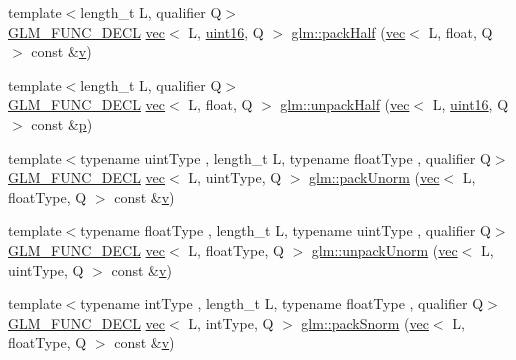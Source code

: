 \begin{DoxyCompactItemize}
\item 
{\footnotesize template$<$length\+\_\+t L, qualifier Q$>$ }\\\mbox{\hyperlink{setup_8hpp_ab2d052de21a70539923e9bcbf6e83a51}{G\+L\+M\+\_\+\+F\+U\+N\+C\+\_\+\+D\+E\+CL}} \mbox{\hyperlink{structglm_1_1vec}{vec}}$<$ L, \mbox{\hyperlink{group__gtc__type__precision_gad8c2939e1fdd8e5828b31d95c52255d5}{uint16}}, Q $>$ \mbox{\hyperlink{group__gtc__packing_ga2d8bbce673ebc04831c1fb05c47f5251}{glm\+::pack\+Half}} (\mbox{\hyperlink{structglm_1_1vec}{vec}}$<$ L, float, Q $>$ const \&\mbox{\hyperlink{_s_d_l__opengl_8h_a10a82eabcb59d2fcd74acee063775f90}{v}})
\item 
{\footnotesize template$<$length\+\_\+t L, qualifier Q$>$ }\\\mbox{\hyperlink{setup_8hpp_ab2d052de21a70539923e9bcbf6e83a51}{G\+L\+M\+\_\+\+F\+U\+N\+C\+\_\+\+D\+E\+CL}} \mbox{\hyperlink{structglm_1_1vec}{vec}}$<$ L, float, Q $>$ \mbox{\hyperlink{group__gtc__packing_ga30d6b2f1806315bcd6047131f547d33b}{glm\+::unpack\+Half}} (\mbox{\hyperlink{structglm_1_1vec}{vec}}$<$ L, \mbox{\hyperlink{group__gtc__type__precision_gad8c2939e1fdd8e5828b31d95c52255d5}{uint16}}, Q $>$ const \&\mbox{\hyperlink{_s_d_l__opengl__glext_8h_aa5367c14d90f462230c2611b81b41d23}{p}})
\item 
{\footnotesize template$<$typename uint\+Type , length\+\_\+t L, typename float\+Type , qualifier Q$>$ }\\\mbox{\hyperlink{setup_8hpp_ab2d052de21a70539923e9bcbf6e83a51}{G\+L\+M\+\_\+\+F\+U\+N\+C\+\_\+\+D\+E\+CL}} \mbox{\hyperlink{structglm_1_1vec}{vec}}$<$ L, uint\+Type, Q $>$ \mbox{\hyperlink{group__gtc__packing_gaccd3f27e6ba5163eb7aa9bc8ff96251a}{glm\+::pack\+Unorm}} (\mbox{\hyperlink{structglm_1_1vec}{vec}}$<$ L, float\+Type, Q $>$ const \&\mbox{\hyperlink{_s_d_l__opengl_8h_a10a82eabcb59d2fcd74acee063775f90}{v}})
\item 
{\footnotesize template$<$typename float\+Type , length\+\_\+t L, typename uint\+Type , qualifier Q$>$ }\\\mbox{\hyperlink{setup_8hpp_ab2d052de21a70539923e9bcbf6e83a51}{G\+L\+M\+\_\+\+F\+U\+N\+C\+\_\+\+D\+E\+CL}} \mbox{\hyperlink{structglm_1_1vec}{vec}}$<$ L, float\+Type, Q $>$ \mbox{\hyperlink{group__gtc__packing_ga3e6ac9178b59f0b1b2f7599f2183eb7f}{glm\+::unpack\+Unorm}} (\mbox{\hyperlink{structglm_1_1vec}{vec}}$<$ L, uint\+Type, Q $>$ const \&\mbox{\hyperlink{_s_d_l__opengl_8h_a10a82eabcb59d2fcd74acee063775f90}{v}})
\item 
{\footnotesize template$<$typename int\+Type , length\+\_\+t L, typename float\+Type , qualifier Q$>$ }\\\mbox{\hyperlink{setup_8hpp_ab2d052de21a70539923e9bcbf6e83a51}{G\+L\+M\+\_\+\+F\+U\+N\+C\+\_\+\+D\+E\+CL}} \mbox{\hyperlink{structglm_1_1vec}{vec}}$<$ L, int\+Type, Q $>$ \mbox{\hyperlink{group__gtc__packing_gaa54b5855a750d6aeb12c1c902f5939b8}{glm\+::pack\+Snorm}} (\mbox{\hyperlink{structglm_1_1vec}{vec}}$<$ L, float\+Type, Q $>$ const \&\mbox{\hyperlink{_s_d_l__opengl_8h_a10a82eabcb59d2fcd74acee063775f90}{v}})

\end{DoxyCompactItemize}
